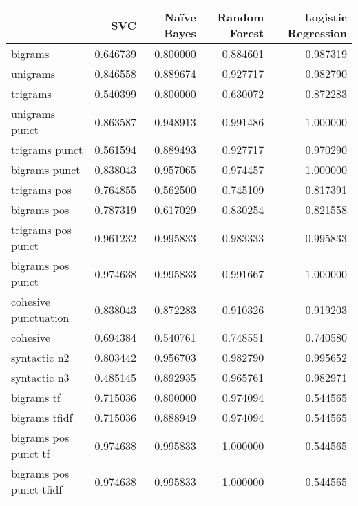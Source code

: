 \begin{tabular}{lrrrr}
\toprule
{} &       SVC &  Naïve Bayes &  Random Forest &  Logistic Regression \\
\midrule
bigrams                    &  0.646739 &     0.800000 &       0.884601 &             0.987319 \\
unigrams                   &  0.846558 &     0.889674 &       0.927717 &             0.982790 \\
trigrams                   &  0.540399 &     0.800000 &       0.630072 &             0.872283 \\
unigrams punct             &  0.863587 &     0.948913 &       0.991486 &             1.000000 \\
trigrams punct             &  0.561594 &     0.889493 &       0.927717 &             0.970290 \\
bigrams punct              &  0.838043 &     0.957065 &       0.974457 &             1.000000 \\
trigrams pos               &  0.764855 &     0.562500 &       0.745109 &             0.817391 \\
bigrams pos                &  0.787319 &     0.617029 &       0.830254 &             0.821558 \\
trigrams pos punct         &  0.961232 &     0.995833 &       0.983333 &             0.995833 \\
bigrams pos punct          &  0.974638 &     0.995833 &       0.991667 &             1.000000 \\
cohesive punctuation       &  0.838043 &     0.872283 &       0.910326 &             0.919203 \\
cohesive                   &  0.694384 &     0.540761 &       0.748551 &             0.740580 \\
syntactic n2               &  0.803442 &     0.956703 &       0.982790 &             0.995652 \\
syntactic n3               &  0.485145 &     0.892935 &       0.965761 &             0.982971 \\
bigrams tf                 &  0.715036 &     0.800000 &       0.974094 &             0.544565 \\
bigrams tfidf              &  0.715036 &     0.888949 &       0.974094 &             0.544565 \\
bigrams pos punct tf       &  0.974638 &     0.995833 &       1.000000 &             0.544565 \\
bigrams pos punct tfidf    &  0.974638 &     0.995833 &       1.000000 &             0.544565 \\

\end{tabular}
